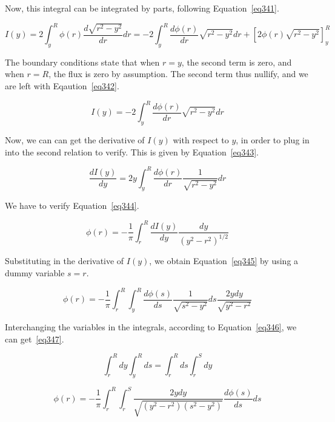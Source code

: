 Now, this integral can be integrated by parts, following Equation~\ref{eq341}.


\begin{equation}\label{eq341}
I(y) = 2 \int_{y}^{R} \phi(r) \frac{d \sqrt{r^2-y^2}}{dr}dr = -2 \int_{y}^{R} \frac{d\phi(r)}{dr} \sqrt{r^2-y^2}dr + \left[ 2\phi(r)\sqrt{r^2-y^2} \right]_y^R
\end{equation}

The boundary conditions state that when $r=y$, the second term is zero, and when $r=R$, the flux is zero by assumption. The second term thus nullify, and we are left with Eqaution~\ref{eq342}.


\begin{equation}\label{eq342}
I(y) = -2 \int_{y}^{R} \frac{d\phi(r)}{dr} \sqrt{r^2-y^2}dr
\end{equation}

Now, we can can get the derivative of $I(y)$ with respect to $y$, in order to plug in into the second relation to verify. This is given by Equation~\ref{eq343}.


\begin{equation}\label{eq343}
\frac{dI(y)}{dy} = 2y \int_{y}^{R} \frac{d\phi(r)}{dr} \frac{1}{\sqrt{r^2-y^2}}dr
\end{equation}

We have to verify Equation~\ref{eq344}.


\begin{equation}\label{eq344}
\phi(r) = -\frac{1}{\pi} \int_r^R \frac{dI(y)}{dy} \frac{dy}{(y^2-r^2)^{1/2}}
\end{equation}

Substituting in the derivative of $I(y)$, we obtain Equation~\ref{eq345} by using a dummy variable $s = r$.


\begin{equation}\label{eq345}
\phi(r) = -\frac{1}{\pi} \int_r^R \int_y^R \frac{d\phi(s)}{ds} \frac{1}{\sqrt{s^2-y^2}} ds \frac{2ydy}{\sqrt{y^2-r^2}}
\end{equation}

Interchanging the variables in the integrals, according to Equation~\ref{eq346}, we can get~\ref{eq347}.


\begin{equation}\label{eq346}
\int_r^R dy \int_y^R ds = \int_r^R ds \int_r^S dy
\end{equation}

\begin{equation}\label{eq347}
\phi(r) = -\frac{1}{\pi} \int_r^R \int_r^S \frac{2ydy}{\sqrt{(y^2-r^2)(s^2-y^2)}} \frac{d\phi(s)}{ds} ds 
\end{equation}

